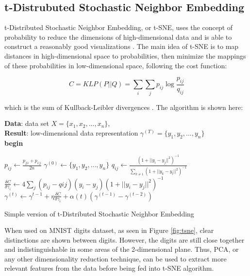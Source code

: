 \documentclass[twocolumn]{article}
\begin{document}
\subsection{t-Distrubuted Stochastic Neighbor Embedding}

t-Distributed Stochastic Neighbor Embedding, or t-SNE, uses the concept of probability to reduce the
dimensions of high-dimensional data and is able to construct a reasonably good visualizations
\cite{tsne}. The main idea of t-SNE is to map distances in high-dimensional space to
probabilities, then minimize the mappings of these probabilities in low-dimensional space,
following the cost function:

\begin{equation}
  C = KLP(P||Q) = \sum_i\sum_jp_{ij}\log\frac{p_{ij}}{q_{ij}}
  \label{eqn:klp}
\end{equation}

which is the sum of Kullback-Leibler divergences \cite{klp}. The algorithm is shown here:

\begin{algorithm*}
  \textbf{Data}: data set $X = \{x_1,x_2,...,x_n\}$, \\
  \textbf{Result}: low-dimensional data representation $\gamma^{(T)} = \{y_1,y_2,...,y_n\}$ \\
  \textbf{begin}
  \begin{algorithmic}[1]
    \State $p_{ij} \gets \frac{p_{j|i}+p_{i|j}}{2n}$
    \State $\gamma^{(0)} \gets \{y_1,y_2,...,y_n\}$
      \State $q_{ij} \gets \frac{{(1+{||y_i-y_j||}^2)}^{-1}}{\sum_{k \neq 1} {(1+{||y_k-y_l||}^2)}^{-1}}$
      \State $\frac{\delta C}{\delta \gamma_i} \gets 4 \sum_j (p_{ij}-q{ij})(y_i-y_j){(1+{||y_i-y_j||}^2)}^{-1}$
      \State $\gamma^{(t)} \gets \gamma^{t-1} + \eta \frac{\delta C}{\delta \gamma_i}+\alpha(t)(\gamma^{(t-1)}-\gamma^{(t-2)})$
    \EndFor
  \end{algorithmic}
  \caption{Simple version of t-Distributed Stochastic Neighbor Embedding}
\end{algorithm*}

\pagebreak

When used on MNIST digits dataset, as seen in Figure \ref{fig:tsne}, clear distinctions are shown
between digits. However, the digits are still close together and indistinguishable in some areas of
the 2-dimensional plane. Thus, PCA, or any other dimensionality reduction technique, can be used to
extract more relevant features from the data before being fed into t-SNE algorithm.
\end{document}
